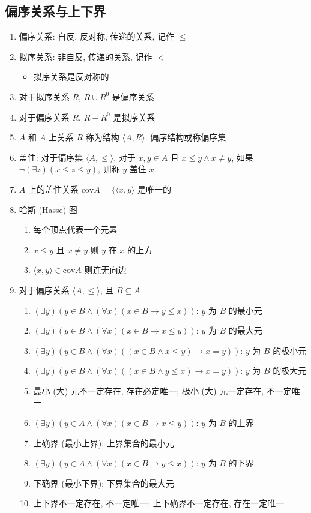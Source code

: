 \documentclass[11pt,a4paper,twocolumn,fleqn]{article} %
\begin{document}
\subsection{偏序关系与上下界} %
\label{sub:partial_ordering}
\begin{enumerate}
	\item 偏序关系: 自反, 反对称, 传递的关系, 记作 $\le$
	\item 拟序关系: 非自反, 传递的关系, 记作 $<$
	\begin{itemize}
		\item 拟序关系是反对称的
	\end{itemize}
	\item 对于拟序关系 $R$, $R\cup R^0$ 是偏序关系
	\item 对于偏序关系 $R$, $R - R^0$ 是拟序关系
	\item $A$ 和 $A$ 上关系 $R$ 称为结构 $\langle A, R \rangle$. 
	偏序结构或称偏序集
	\item 盖住: 对于偏序集 $\langle A, \le \rangle$, 对于 $x, y\in A$ 
	且 $x\le y \land x\neq y$, 如果 $\lnot(\exists z)(x\le z \le y)$, 
	则称 $y$ 盖住 $x$
	\item $A$ 上的盖住关系 $\mathrm{cov}A = \{\langle x, y \rangle$ 是唯一的
	\item 哈斯 (Hasse) 图
	\begin{enumerate}
		\item 每个顶点代表一个元素
		\item $x\le y$ 且 $x\neq y$ 则 $y$ 在 $x$ 的上方
		\item $\langle x, y \rangle \in \mathrm{cov}A$ 则连无向边
	\end{enumerate}
	\item 对于偏序关系 $\langle A, \le \rangle$, 且 $B\subseteq A$
	\begin{enumerate}
		\item $(\exists y)(y\in B \land (\forall x)(x\in B \to y\le x))$: 
		$y$ 为 $B$ 的最小元
		\item $(\exists y)(y\in B \land (\forall x)(x\in B \to x\le y))$: 
		$y$ 为 $B$ 的最大元
		\item $(\exists y)(y\in B \land (\forall x)((x\in B\land x\le y) \to x=y))$: 
		$y$ 为 $B$ 的极小元
		\item $(\exists y)(y\in B \land (\forall x)((x\in B\land y\le x) \to x=y))$: 
		$y$ 为 $B$ 的极大元
		\item 最小 (大) 元不一定存在, 存在必定唯一; 
		极小 (大) 元一定存在, 不一定唯一
		\item $(\exists y)(y\in A \land (\forall x)(x\in B \to x\le y))$: 
		$y$ 为 $B$ 的上界
		\item 上确界 (最小上界): 上界集合的最小元
		\item $(\exists y)(y\in A \land (\forall x)(x\in B \to y\le x))$: 
		$y$ 为 $B$ 的下界
		\item 下确界 (最小下界): 下界集合的最大元
		\item 上下界不一定存在, 不一定唯一; 上下确界不一定存在, 存在一定唯一
	\end{enumerate}
\end{enumerate}
\end{document}
